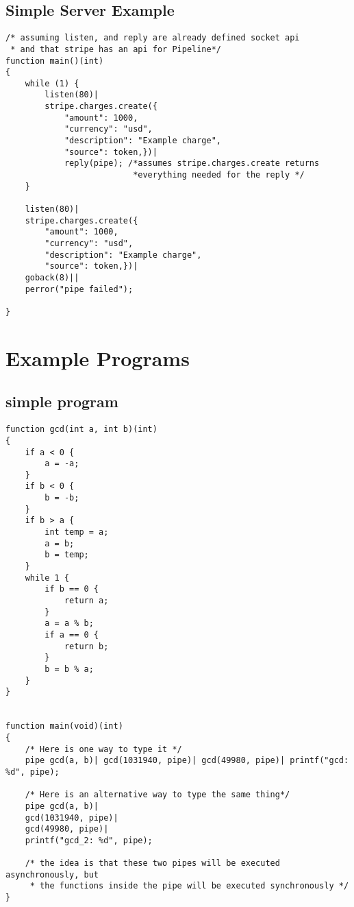 \documentclass[11pt]{article}
\begin{document}
\subsection{Simple Server Example}
\begin{lstlisting}
/* assuming listen, and reply are already defined socket api
 * and that stripe has an api for Pipeline*/
function main()(int)
{
	while (1) {
		listen(80)|
		stripe.charges.create({
			"amount": 1000,
			"currency": "usd",
			"description": "Example charge",
			"source": token,})|
			reply(pipe); /*assumes stripe.charges.create returns
			              *everything needed for the reply */
	}
	
	listen(80)|
	stripe.charges.create({
		"amount": 1000,
		"currency": "usd",
		"description": "Example charge",
		"source": token,})|
	goback(8)||
	perror("pipe failed");
	
}	
\end{lstlisting}
\section{Example Programs}
\subsection{simple program}
\begin{lstlisting}
function gcd(int a, int b)(int)
{
	if a < 0 {
		a = -a;
	}
	if b < 0 {
		b = -b;
	}
	if b > a {
		int temp = a;
		a = b;
		b = temp;
	}
	while 1 {
		if b == 0 {
			return a;
		}
		a = a % b;
		if a == 0 {
			return b;		
		}
		b = b % a;
	}
}


function main(void)(int)
{
	/* Here is one way to type it */
	pipe gcd(a, b)| gcd(1031940, pipe)| gcd(49980, pipe)| printf("gcd: %d", pipe);
	
	/* Here is an alternative way to type the same thing*/
	pipe gcd(a, b)|
	gcd(1031940, pipe)|
	gcd(49980, pipe)|
	printf("gcd_2: %d", pipe);
	
	/* the idea is that these two pipes will be executed asynchronously, but
	 * the functions inside the pipe will be executed synchronously */
}

\end{lstlisting}
\end{document}
